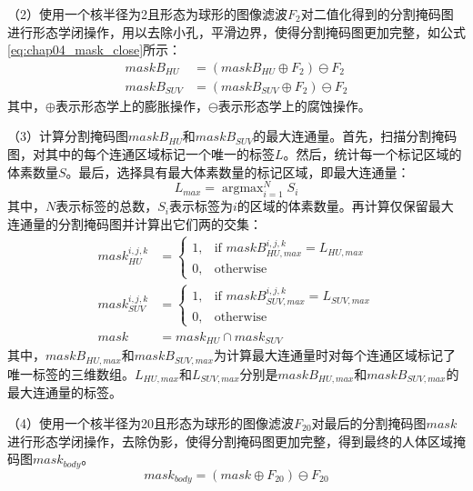 （2）使用一个核半径为2且形态为球形的图像滤波\(F_2\)对二值化得到的分割掩码图进行形态学闭操作，用以去除小孔，平滑边界，使得分割掩码图更加完整，如公式\ref{eq:chap04_mask_close}所示：
\begin{equation}
  \begin{aligned}
    maskB_{HU}  & = (maskB_{HU} \oplus F_2 ) \ominus F_2  \\
    maskB_{SUV} & = (maskB_{SUV} \oplus F_2 ) \ominus F_2
  \end{aligned}
  \label{eq:chap04_mask_close}
\end{equation}
其中，\(\oplus\)表示形态学上的膨胀操作，\(\ominus\)表示形态学上的腐蚀操作。

（3）计算分割掩码图\(maskB_{HU}\)和\(maskB_{SUV}\)的最大连通量。首先，扫描分割掩码图，对其中的每个连通区域标记一个唯一的标签\(L\)。然后，统计每一个标记区域的体素数量\(S\)。最后，选择具有最大体素数量的标记区域，即最大连通量：
\begin{equation}
  L_{max} = \mathop{\arg\max}_{i=1}^N S_i
\end{equation}
其中，\(N\)表示标签的总数，\(S_i\)表示标签为\(i\)的区域的体素数量。再计算仅保留最大连通量的分割掩码图并计算出它们两的交集：
\begin{equation}
  \begin{aligned}
    mask_{HU}^{i,j,k}  & =
    \begin{cases}
      1, & \text{if \(maskB_{HU, max}^{i,j,k} = L_{HU,max}\)} \\
      0, & \text{otherwise}
    \end{cases}  \\
    mask_{SUV}^{i,j,k} & =
    \begin{cases}
      1, & \text{if \(maskB_{SUV, max}^{i,j,k} = L_{SUV,max}\)} \\
      0, & \text{otherwise}
    \end{cases} \\
    mask               & = mask_{HU} \cap mask_{SUV}
  \end{aligned}
\end{equation}
其中，\(maskB_{HU, max}\)和\(maskB_{SUV, max}\)为计算最大连通量时对每个连通区域标记了唯一标签的三维数组。\(L_{HU,max}\)和\(L_{SUV,max}\)分别是\(maskB_{HU, max}\)和\(maskB_{SUV, max}\)的最大连通量的标签。

（4）使用一个核半径为20且形态为球形的图像滤波\(F_{20}\)对最后的分割掩码图\(mask\)进行形态学闭操作，去除伪影，使得分割掩码图更加完整，得到最终的人体区域掩码图\(mask_{body}\)。
\begin{equation}
  mask_{body} = (mask \oplus F_{20} ) \ominus F_{20}
\end{equation}


